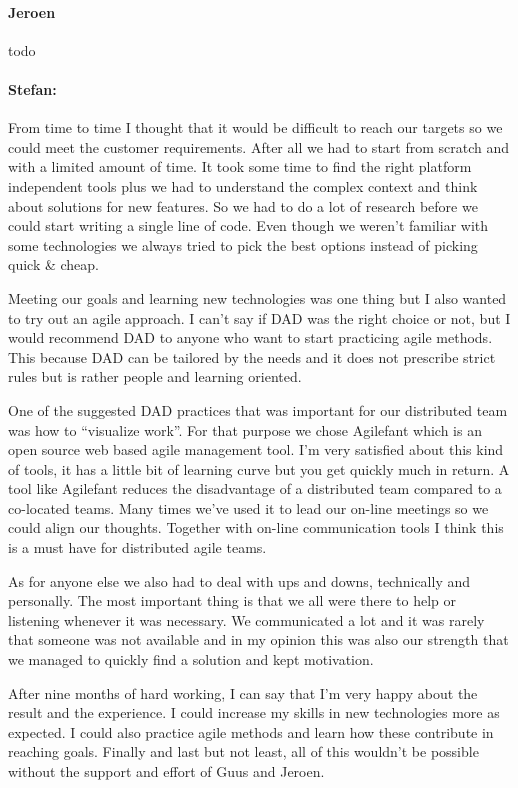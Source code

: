 \paragraph{Jeroen}
todo \\ 

\paragraph{Stefan: }
From time to time I thought that it would be difficult to reach our targets so
we could meet the customer requirements. After all we had to start from scratch
and with a limited amount of time. It took some time to find the right platform
independent tools plus we had to understand the complex context and think about
solutions for new features. So we had to do a lot of research before we could
start writing a single line of code. Even though we weren't familiar with some
technologies we always tried to pick the best options instead of picking quick
\& cheap.

Meeting our goals and learning new technologies was one thing but I also wanted
to try out an agile approach. I can't say if DAD was the right choice or not,
but I would recommend DAD to anyone who want to start practicing agile methods.
This because DAD can be tailored by the needs and it does not prescribe strict
rules but is rather people and learning oriented.

One of the suggested DAD practices that was important for our distributed team
was how to ``visualize work''. For that purpose we chose Agilefant which is an
open source web based agile management tool. I'm very satisfied about this kind
of tools, it has a little bit of learning curve but you get quickly much in
return. A tool like Agilefant reduces the disadvantage of a distributed team
compared to a co-located teams. Many times we've used it to lead our on-line
meetings so we could align our thoughts. Together with on-line communication
tools I think this is a must have for distributed agile teams.

As for anyone else we also had to deal with ups and downs, technically and
personally. The most important thing is that we all were there to help or
listening whenever it was necessary. We communicated a lot and it was rarely
that someone was not available and in my opinion this was also our strength that
we managed to quickly find a solution and kept motivation.

After nine months of hard working, I can say that I'm very happy about the
result and the experience. I could increase my skills in new technologies more
as expected. I could also practice agile methods and learn how these contribute
in reaching goals. Finally and last but not least, all of this wouldn't be possible
without the support and effort of Guus and Jeroen.
